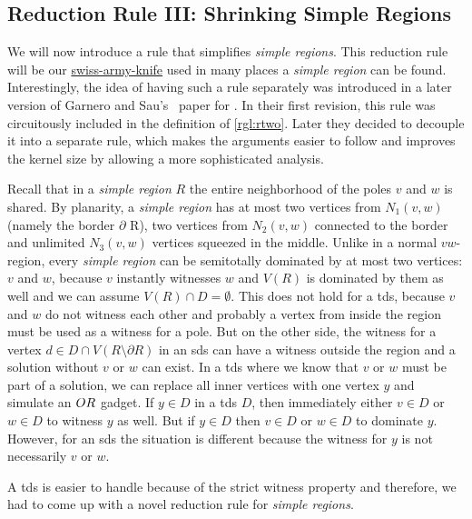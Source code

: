 \subsection{Reduction Rule III: Shrinking Simple Regions}

We will now introduce a rule that simplifies \textit{simple regions}.
This reduction rule will be our \href{https://en.wikipedia.org/wiki/Swiss_Army_knife}{swiss-army-knife} used in many places a \textit{simple region} can be found.
Interestingly, the idea of having such a rule separately was introduced in a later version of Garnero and Sau's~\cite{Garnero2018} paper for \ptdom.
In their first revision, this rule was circuitously included in the definition of \cref{rgl:rtwo}.
Later they decided to decouple it into a separate rule, which makes the arguments easier to follow and improves the kernel size by allowing a more sophisticated analysis.

Recall that in a \textit{simple region} $R$ the entire neighborhood of the poles $v$ and $w$ is shared.  
By planarity, a \textit{simple region} has at most two vertices from $N_1(v,w)$ (namely the border $\partial$ R), two vertices from $N_2(v,w)$ connected to the border and unlimited $N_3(v,w)$ vertices squeezed in the middle.
Unlike in a normal $vw$-region, every \textit{simple region} can be semitotally dominated by at most two vertices: $v$ and $w$, because $v$ instantly witnesses $w$ and $V(R)$ is dominated by them as well and we can assume $V(R) \cap D = \emptyset$.
This does not hold for a tds, because $v$ and $w$ do not witness each other and probably a vertex from inside the region must be used as a witness for a pole.
But on the other side, the witness for a vertex $d \in D \cap V(R \setminus \partial R)$ in an sds can have a witness outside the region and a solution without $v$ or $w$ can exist. 
In a tds where we know that $v$ or $w$ must be part of a solution, we can replace all inner vertices with one vertex $y$ and simulate an $\mathnormal{OR}$ gadget.
If $y \in D$ in a tds $D$, then immediately either $v \in D$ or $w \in D$ to witness $y$ as well. But if $y \in D$ then $v \in D$ or $w \in D$ to dominate $y$.
However, for an sds the situation is different because the witness for $y$ is not necessarily $v$ or $w$.

A tds is easier to handle because of the strict witness property and therefore, we had to come up with a novel reduction rule for \textit{simple regions}.

